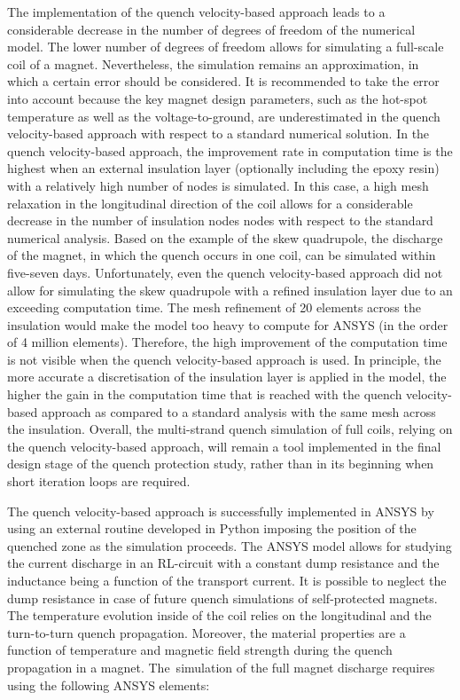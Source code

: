 The implementation of the quench velocity-based approach leads to a considerable decrease in the number of degrees of freedom of the numerical model. The lower number of degrees of freedom allows for simulating a full-scale coil of a magnet. Nevertheless, the simulation remains an approximation, in which a certain error should be considered. It is recommended to take the error into account because the key magnet design parameters, such as the hot-spot temperature as well as the voltage-to-ground, are underestimated in the quench velocity-based approach with respect to a standard numerical solution. In the quench velocity-based approach, the improvement rate in computation time is the highest when an external insulation layer (optionally including the epoxy resin) with a relatively high number of nodes is simulated. In this case, a high mesh relaxation in the longitudinal direction of the coil allows for a considerable decrease in the number of insulation nodes nodes with respect to the standard numerical analysis. Based on the example of the skew quadrupole, the discharge of the magnet, in which the quench occurs in one coil, can be simulated within five-seven days. Unfortunately, even the quench velocity-based approach did not allow for simulating the skew quadrupole with a refined insulation layer due to an exceeding computation time. The mesh refinement of 20 elements across the insulation would make the model too heavy to compute for ANSYS (in the order of 4 million elements). Therefore, the high improvement of the computation time is not visible when the quench velocity-based approach is used. In principle, the more accurate a discretisation of the insulation layer is applied in the model, the higher the gain in the computation time that is reached with the quench velocity-based approach as compared to a standard analysis with the same mesh across the insulation. Overall, the multi-strand quench simulation of full coils, relying on the quench velocity-based approach, will remain a tool implemented in the final design stage of the quench protection study, rather than in its beginning when short iteration loops are required.

The quench velocity-based approach is successfully implemented in ANSYS by using an external routine developed in Python imposing the position of the quenched zone as the simulation proceeds. The ANSYS model allows for studying the current discharge in an RL-circuit with a constant dump resistance and the inductance being a function of the transport current. It is possible to neglect the dump resistance in case of future quench simulations of self-protected magnets. The temperature evolution inside of the coil relies on the longitudinal and the turn-to-turn quench propagation. Moreover, the material properties are a function of temperature and magnetic field strength during the quench propagation in a magnet. The~simulation of the full magnet discharge requires using the following ANSYS elements: 

